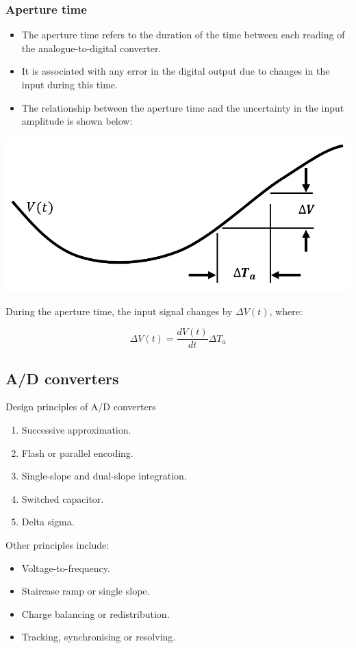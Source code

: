 \documentclass[11pt]{article}
\begin{document}
\subsubsection{Aperture time}
\label{sec:org944bb52}
\begin{itemize}
\item The aperture time refers to the duration of the time between each reading of the analogue-to-digital converter.
\item It is associated with any error in the digital output due to changes in the input during this time.
\item The relationship between the aperture time and the uncertainty in the input amplitude is shown below:
\end{itemize}

\begin{center}
\includegraphics[width=.9\linewidth]{./images/aperture-time-illustration.png}
\end{center}

During the aperture time, the input signal changes by \(\Delta V (t)\), where:

\[\Delta V (t) = \frac{dV (t)}{dt} \Delta T_a\]
\subsection{A/D converters}
\label{sec:orge295ec2}
Design principles of A/D converters
\begin{enumerate}
\item Successive approximation.
\item Flash or parallel encoding.
\item Single-slope and dual-slope integration.
\item Switched capacitor.
\item Delta sigma.
\end{enumerate}

Other principles include:
\begin{itemize}
\item Voltage-to-frequency.
\item Staircase ramp or single slope.
\item Charge balancing or redistribution.
\item Tracking, synchronising or resolving.
\end{itemize}
\end{document}
